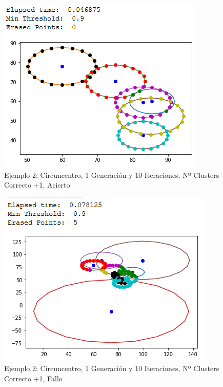 \documentclass[conference,a4paper]{IEEEtran}
\begin{document}
\begin{figure}[H]
\centering
\includegraphics[scale=0.65]{Experimentacion/Ejemplo2/ej2_c_1_10_mc_correct}
\caption{Ejemplo 2: Circuncentro, 1 Generación y 10 Iteraciones,  Nº Clusters Correcto +1, Acierto\\}
\end{figure}

\begin{figure}[H]
\centering
\includegraphics[scale=0.65]{Experimentacion/Ejemplo2/ej2_c_1_10_mc_wrong}
\caption{Ejemplo 2: Circuncentro, 1 Generación y 10 Iteraciones,  Nº Clusters Correcto +1, Fallo\\}
\end{figure}
\end{document}

